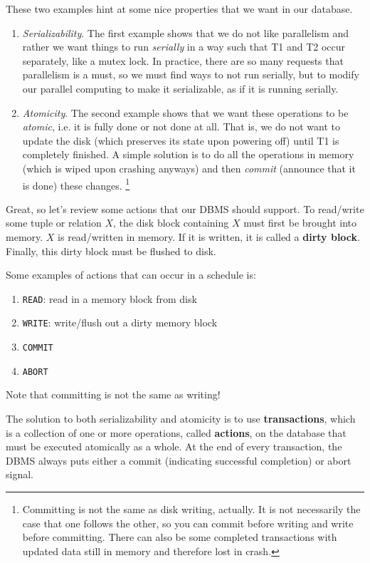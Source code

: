  These two examples hint at some nice properties that we want in our database. 
  \begin{enumerate}
    \item \textit{Serializability}. The first example shows that we do not like parallelism and rather we want things to run \textit{serially} in a way such that T1 and T2 occur separately, like a mutex lock. In practice, there are so many requests that parallelism is a must, so we must find ways to not run serially, but to modify our parallel computing to make it serializable, as if it is running serially.  
    \item \textit{Atomicity}. The second example shows that we want these operations to be \textit{atomic}, i.e. it is fully done or not done at all. That is, we do not want to update the disk (which preserves its state upon powering off) until  T1 is completely finished. A simple solution is to do all the operations in memory (which is wiped upon crashing anyways) and then \textit{commit} (announce that it is done) these changes. \footnote{Committing is not the same as disk writing, actually. It is not necessarily the case that one follows the other, so you can commit before writing and write before committing. There can also be some completed transactions with updated data still in memory and therefore lost in crash.} 
  \end{enumerate} 

  Great, so let's review some actions that our DBMS should support. To read/write some tuple or relation $X$, the disk block containing $X$ must first be brought into memory. $X$ is read/written in memory. If it is written, it is called a \textbf{dirty block}. Finally, this dirty block must be flushed to disk. 

  \begin{definition}[Actions]
    Some examples of actions that can occur in a schedule is: 
    \begin{enumerate}
      \item \texttt{READ}: read in a memory block from disk
      \item \texttt{WRITE}: write/flush out a dirty memory block 
      \item \texttt{COMMIT}
      \item \texttt{ABORT} 
    \end{enumerate}
    Note that committing is not the same as writing! 
  \end{definition}

  \begin{definition}[Transaction]
    The solution to both serializability and atomicity is to use \textbf{transactions}, which is a collection of one or more operations, called \textbf{actions}, on the database that must be executed atomically as a whole. At the end of every transaction, the DBMS always puts either a commit (indicating successful completion) or abort signal. 
  \end{definition} 

